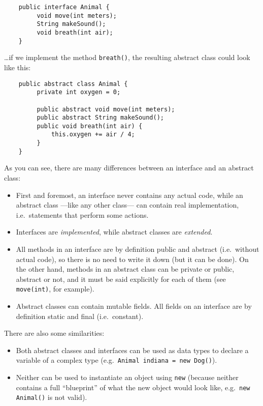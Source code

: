\begin{verbatim}
    public interface Animal {
         void move(int meters);
         String makeSound();
         void breath(int air);
    }
\end{verbatim}

\ldots if we implement the method \verb+breath()+, the resulting
abstract class could look like this: 

\begin{verbatim}
    public abstract class Animal {
         private int oxygen = 0;

         public abstract void move(int meters);
         public abstract String makeSound();
         public void breath(int air) {
             this.oxygen += air / 4;
         }
    }        
\end{verbatim}

As you can see, there are many differences between an interface and an
abstract class: 

\begin{itemize}
\item First and foremost, an interface never contains any actual code,
  while an abstract class ---like any other class--- can contain real
  implementation, i.e.~statements that perform some actions.
\item Interfaces are \emph{implemented}, while abstract classes are
  \emph{extended}.
\item All methods in an interface are by definition public and
  abstract (i.e.~without actual code), so there is no need to write it
  down (but it can be done). On the other hand, methods in an abstract
  class can be private or public, abstract or not, and it must be said
  explicitly for each of them (see \verb+move(int)+, for example).
\item Abstract classes can contain mutable fields. All fields on an
  interface are by definition static and final (i.e.~constant).
\end{itemize}

There are also some similarities: 

\begin{itemize}
\item Both abstract classes and interfaces can be used as data
  types to declare a variable of a complex type 
  (e.g.~\verb+Animal indiana = new Dog()+).
\item Neither can be used to instantiate an object using \verb+new+
  (because neither contains a full ``blueprint'' of what the new
  object would look like, e.g.~\verb+new Animal()+ is not valid). 
\end{itemize}


